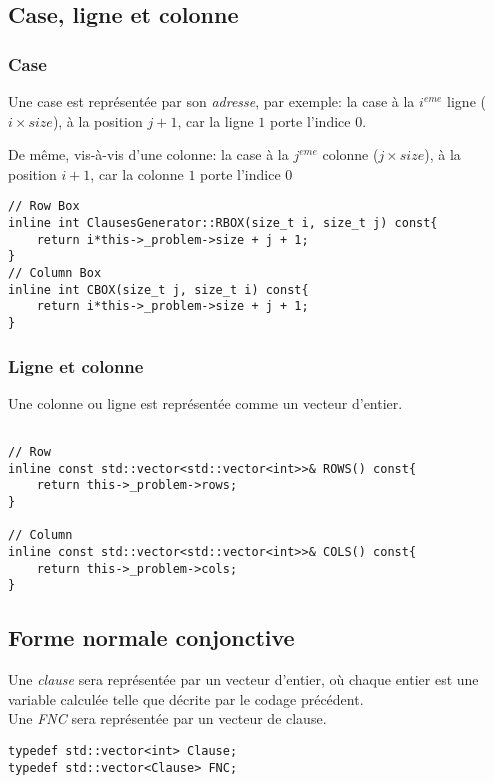 \documentclass[a4paper,12pt]{report}
\begin{document}
\subsection{Case, ligne et colonne}
\subsubsection{Case}
Une case est représentée par son \textit{adresse}, par exemple: la case à la $i^{eme}$ ligne ($i\times size$), à la position $j+1$, car la ligne $1$ porte l'indice $0$.

De même, vis-à-vis d'une colonne: la case à la $j^{eme}$ colonne ($j\times size$), à la position $i+1$, car la colonne $1$ porte l'indice $0$
\lstset{style=Cpp, caption=Cases, label=C:Cases}
\begin{lstlisting}[mathescape=true]
// Row Box
inline int ClausesGenerator::RBOX(size_t i, size_t j) const{
	return i*this->_problem->size + j + 1;
}
// Column Box
inline int CBOX(size_t j, size_t i) const{
	return i*this->_problem->size + j + 1;
}
\end{lstlisting}


\subsubsection{Ligne et colonne}
Une colonne ou ligne est représentée comme un vecteur d'entier.
\lstset{style=Cpp, caption=Ligne et colonne, label=C:RowColumn}
\begin{lstlisting}[mathescape=true]

// Row
inline const std::vector<std::vector<int>>& ROWS() const{
	return this->_problem->rows;
}

// Column
inline const std::vector<std::vector<int>>& COLS() const{
	return this->_problem->cols;
}
\end{lstlisting}

\subsection{Forme normale conjonctive}
Une \textit{clause} sera représentée par un vecteur d'entier, où chaque entier est une variable calculée telle que décrite par le codage précédent.\\
Une \textit{FNC} sera représentée par un vecteur de clause.				
\lstset{style=Cpp, caption=clause et FNC, label=C:FNC_Clause}
\begin{lstlisting}[mathescape=true]	
typedef std::vector<int> Clause;
typedef std::vector<Clause> FNC;
\end{lstlisting}
\end{document}
